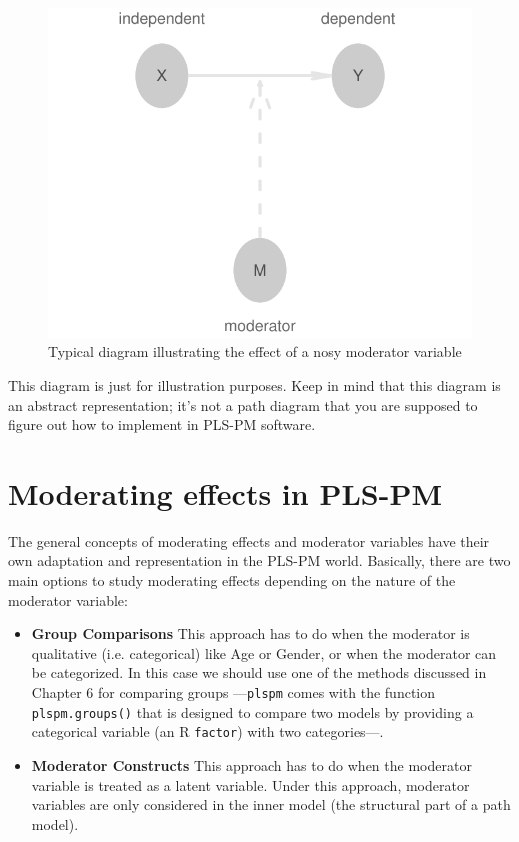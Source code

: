 \documentclass[12pt]{book}\usepackage{graphicx, color}
\newenvironment{knitrout}{}{} %
\newcommand{\plspm}{\texttt{plspm}}
\newcommand{\code}[1]{\texttt{#1}}
\begin{document}
\begin{knitrout}
\color{fgcolor}\begin{figure}[h]


{\centering \includegraphics[width=.7\linewidth,height=.4\linewidth]{figure/typical_moderator} 

}

\caption[Typical diagram illustrating the effect of a nosy moderator variable]{Typical diagram illustrating the effect of a nosy moderator variable\label{fig:typical_moderator}}
\end{figure}


\end{knitrout}


This diagram is just for illustration purposes. Keep in mind that this diagram is an abstract representation; it's not a path diagram that you are supposed to figure out how to implement in PLS-PM software.



\section{Moderating effects in PLS-PM}
The general concepts of moderating effects and moderator variables have their own adaptation and representation in the PLS-PM world. Basically, there are two main options to study moderating effects depending on the nature of the moderator variable:

\begin{itemize}
 \item \textbf{Group Comparisons} This approach has to do when the moderator is qualitative (i.e. categorical) like Age or Gender, or when the moderator can be categorized. In this case we should use one of the methods discussed in Chapter 6 for comparing groups ---\plspm{} comes with the function \code{plspm.groups()} that is designed to compare two models by providing a categorical variable (an R \code{factor}) with two categories---.
 
 \item \textbf{Moderator Constructs} This approach has to do when the moderator variable is treated as a latent variable. Under this approach, moderator variables are only considered in the inner model (the structural part of a path model).
\end{itemize}
\end{document}
